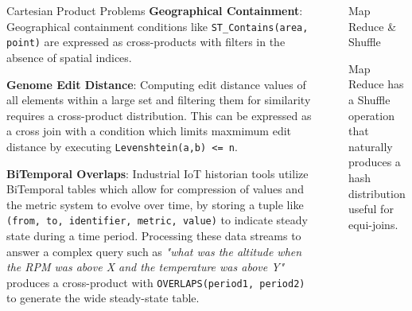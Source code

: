 \documentclass[final]{beamer}
\newlength{\sepwid}
\newlength{\onecolwid}
\newlength{\twocolwid}
\begin{document}
\begin{frame}[t]
\begin{columns}[t]
\begin{column}{\onecolwid}
\begin{block}{Cartesian Product Problems}
\textbf{Geographical Containment}:
Geographical containment conditions like \texttt{ST\_Contains(area, point)} are expressed as cross-products with filters in the absence of spatial indices.

\textbf{Genome Edit Distance}:
Computing edit distance values of all elements within a large set and filtering them for similarity requires a cross-product distribution. This can 
be expressed as a cross join with a condition which limits maxmimum edit distance by executing \texttt{Levenshtein(a,b) <= n}.

\textbf{BiTemporal Overlaps}:
Industrial IoT historian tools utilize BiTemporal tables which allow for compression of values and the metric system to evolve over time, by storing a
tuple like \texttt{(from, to, identifier, metric, value)} to indicate steady state during a time period.
Processing these data streams to answer a complex query such as \textit{"what was the altitude when the RPM was above X and the temperature was above Y"}
produces a cross-product with \texttt{OVERLAPS(period1, period2)} to generate the wide steady-state table.
\end{block}

\end{column} %

\begin{column}{\sepwid}\end{column} %

\begin{column}{\twocolwid} %

\begin{columns}[t,totalwidth=\twocolwid] %

\begin{column}{\onecolwid}\vspace{-.6in} %


\begin{block}{Map Reduce \& Shuffle}

Map Reduce has a Shuffle operation that naturally produces a hash distribution useful for equi-joins.


\end{block}
\end{column}
\end{columns}
\end{column}
\end{columns}
\end{frame}
\end{document}
